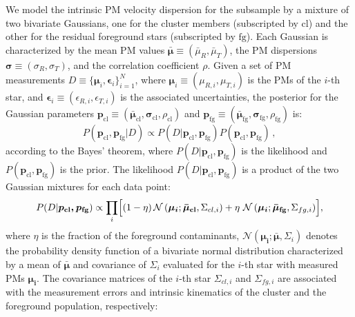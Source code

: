 \documentclass[12pt]{ucsddissertation}
\begin{document}
\begin{CJK*}{UTF8}{gbsn}
We model the intrinsic PM velocity dispersion for the subsample by a mixture of two bivariate Gaussians, one for the cluster members (subscripted by $\mathrm{cl}$) and the other for the residual foreground stars (subscripted by $\mathrm
{fg}$). Each Gaussian is characterized by the mean PM values $\boldsymbol{\bar{\mu}} \equiv \left(\bar{\mu}_{R}, \bar{\mu}_{T}\right)$, the PM dispersions $\boldsymbol{\sigma} \equiv \left(\sigma_{R}, \sigma_{T}\right)$, and the correlation coefficient $\rho$. Given a set of PM measurements $D \equiv \lbrace \boldsymbol{\mu}_i, \boldsymbol{\epsilon}_i \rbrace_{i=1}^N$, where $\boldsymbol{\mu}_i \equiv \left(\mu_{R, i}, \mu_{T, i}\right)$ is the PMs of the $i$-th star, and $\boldsymbol{\epsilon}_i \equiv \left(\epsilon_{R, i}, \epsilon_{T, i}\right)$ is the associated uncertainties, the posterior for the Gaussian parameters $\boldsymbol{p_\mathrm{cl}} \equiv (\boldsymbol{\bar{\mu}}_\mathrm{cl}, \boldsymbol{\sigma_\mathrm{cl}}, \rho_\mathrm{cl})$ and $\boldsymbol{p_\mathrm{fg}} \equiv (\boldsymbol{\bar{\mu}}_\mathrm{fg}, \boldsymbol{\sigma_\mathrm{fg}}, \rho_\mathrm{fg})$ is:
\begin{equation}
P\left(\boldsymbol{p_\mathrm{cl}, \boldsymbol{p_\mathrm{fg}}} | D\right) \propto P\left(D | \boldsymbol{p_\mathrm{cl}, \boldsymbol{p_\mathrm{fg}}}\right) P\left(\boldsymbol{p_\mathrm{cl}}, \boldsymbol{p_\mathrm{fg}}\right)\,,
\end{equation}
according to the Bayes' theorem, where $P\left(D | \boldsymbol{p_\mathrm{cl}, \boldsymbol{p_\mathrm{fg}}}\right)$ is the likelihood and $P\left(\boldsymbol{p_\mathrm{cl}}, \boldsymbol{p_\mathrm{fg}}\right)$ is the prior. The likelihood $P(D|\boldsymbol{p_\mathrm{cl}, \boldsymbol{p_\mathrm{fg}}})$ is a product of the two Gaussian mixtures for each data point:
\begin{equation}
P(D|\boldsymbol{p_\mathrm{cl}, \boldsymbol{p_\mathrm{fg}}})  \propto \prod_{i}
\Bigl[(1-\eta)\,\mathcal{N}\left(\boldsymbol{\mu_i}; \boldsymbol{\bar{\mu}_\mathrm{cl}}, \Sigma_{cl, i}\right) + \eta~\mathcal{N}\left(\boldsymbol{\mu_i}; \boldsymbol{\bar{\mu}_\mathrm{fg}}, \Sigma_{fg, i}\right)\Bigr],
\end{equation}
where $\eta$ is the fraction of the foreground contaminants, $\mathcal{N}\left(\boldsymbol{\mu_i}; \boldsymbol{\bar{\mu}}, \Sigma_i\right)$ denotes the probability density function of a bivariate normal distribution characterized by a mean of $\boldsymbol{\bar{\mu}}$ and covariance of $\Sigma_i$ evaluated for the $i$-th star with measured PMs $\boldsymbol{\mu_i}$. The covariance matrices of the $i$-th star $\Sigma_{cl, i}$ and $\Sigma_{fg, i}$ are associated with the measurement errors and intrinsic kinematics of the cluster and the foreground population, respectively:

\end{CJK*}
\end{document}
